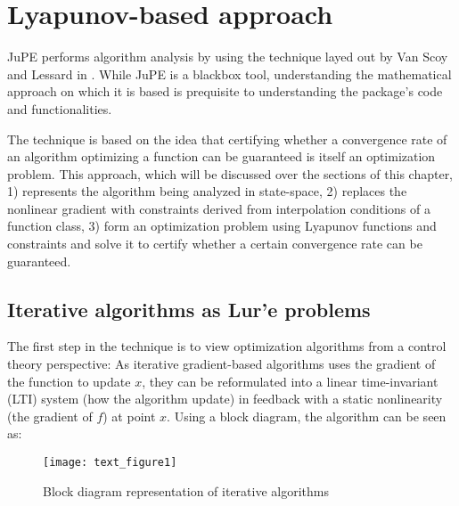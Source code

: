 \chapter{Lyapunov-based approach}\label{chapter:lyapunov}

JuPE performs algorithm analysis by using the technique layed out by Van Scoy and Lessard in \cite{tutorial}. While JuPE is a blackbox tool, understanding the mathematical approach on which it is based is  prequisite to understanding the package's code and functionalities.

The technique is based on the idea that certifying whether a convergence rate of an algorithm optimizing a function can be guaranteed is itself an optimization problem. This approach, which will be discussed over the sections of this chapter, 1) represents the algorithm being analyzed in state-space, 2) replaces the nonlinear gradient with constraints derived from interpolation conditions of a function class, 3) form an optimization problem using Lyapunov functions and constraints and solve it to certify whether a certain convergence rate can be guaranteed.
\section{Iterative algorithms as Lur'e problems}

The first step in the technique is to view optimization algorithms from a control theory perspective: As iterative gradient-based algorithms uses the gradient of the function to update \(x\), they can be reformulated into a linear time-invariant (LTI) system (how the algorithm update) in feedback with a static nonlinearity (the gradient of \(f\)) at point \(x\). Using a block diagram, the algorithm can be seen as:

\begin{figure}[h]
    \centering
	\texttt{[image: text\_figure1]}
    \caption{Block diagram representation of iterative algorithms}
    \label{plot_block_diagram}
\end{figure}


